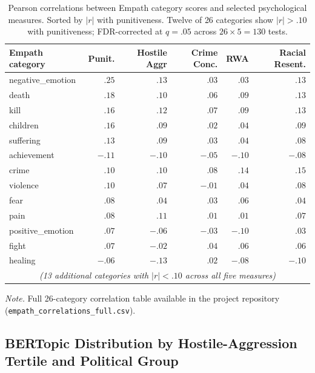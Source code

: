 \begin{table}[htbp]
  \centering
  \caption{Pearson correlations between Empath category scores and selected psychological measures. Sorted by $|r|$ with punitiveness. Twelve of 26 categories show $|r| > .10$ with punitiveness; FDR-corrected at $q = .05$ across $26 \times 5 = 130$ tests.}
  \label{tab:supp_empath}
  \footnotesize
  \begin{tabular}{lrrrrr}
    \toprule
    Empath category   & Punit. & Hostile Aggr & Crime Conc. & RWA & Racial Resent. \\
    \midrule
    negative\_emotion & $.25$  & $.13$  & $.03$  & $.03$ & $.13$ \\
    death             & $.18$  & $.10$  & $.06$  & $.09$ & $.13$ \\
    kill              & $.16$  & $.12$  & $.07$  & $.09$ & $.13$ \\
    children          & $.16$  & $.09$  & $.02$  & $.04$ & $.09$ \\
    suffering         & $.13$  & $.09$  & $.03$  & $.04$ & $.08$ \\
    achievement       & $-.11$ & $-.10$ & $-.05$ & $-.10$ & $-.08$ \\
    crime             & $.10$  & $.10$  & $.08$  & $.14$ & $.15$ \\
    violence          & $.10$  & $.07$  & $-.01$ & $.04$ & $.08$ \\
    fear              & $.08$  & $.04$  & $.03$  & $.06$ & $.04$ \\
    pain              & $.08$  & $.11$  & $.01$  & $.01$ & $.07$ \\
    positive\_emotion & $.07$  & $-.06$ & $-.03$ & $-.10$ & $.03$ \\
    fight             & $.07$  & $-.02$ & $.04$  & $.06$ & $.06$ \\
    healing           & $-.06$ & $-.13$ & $.02$  & $-.08$ & $-.10$ \\
    \multicolumn{6}{c}{\textit{(13 additional categories with $|r| < .10$ across all five measures)}} \\
    \bottomrule
  \end{tabular}

  \vspace{0.3em}
  \footnotesize
  \textit{Note.} Full 26-category correlation table available in the project repository (\texttt{empath\_correlations\_full.csv}).
\end{table}

\subsection{BERTopic Distribution by Hostile-Aggression Tertile and Political Group}
\label{sec:supp_bertopic_by_group}


